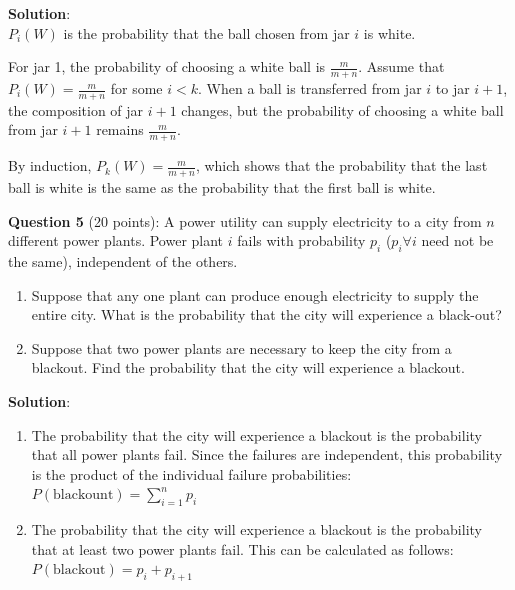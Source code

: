 \documentclass{article}
\begin{document}
\noindent
\textbf{Solution}: \\
$P_i(W)$ is the probability that the ball chosen from jar $i$ is white.

\noindent
For jar 1, the probability of choosing a white ball is $\frac{m}{m+n}$.  Assume that $P_i(W) = \frac{m}{m+n}$ for some $i < k$. When a ball is transferred from jar $i$ to jar $i+1$, the composition of jar $i+1$ changes, but the probability of choosing a white ball from jar $i+1$ remains $\frac{m}{m+n}$.

\noindent
By induction, $P_k(W) = \frac{m}{m+n}$, which shows that the probability that the last ball is white is the same as the probability that the first ball is white.

\vspace{1cm}
\noindent
\textbf{Question 5} (20 points): 
A power utility can supply electricity to a city from $n$ different power plants. Power plant
$i$ fails with probability $p_i$ ($p_i \forall i$ need not be the same), independent of the others.
\begin{enumerate}
    \item Suppose that any one plant can produce enough electricity to supply the entire city.
    What is the probability that the city will experience a black-out?
    \item Suppose that two power plants are necessary to keep the city from a blackout. Find
    the probability that the city will experience a blackout.
\end{enumerate}

\noindent
\textbf{Solution}:
\begin{enumerate}
    \item The probability that the city will experience a blackout is the probability that all power plants fail. Since the failures are independent, this probability is the product of the individual failure probabilities: \\
    $P(\text{blackount}) = \sum_{i=1}^{n} p_i$

    \item The probability that the city will experience a blackout is the probability that at least two power plants fail. This can be calculated as follows: \\
    $P(\text{blackout}) =  p_i + p_{i+1}$
    
\end{enumerate}
\end{document}
